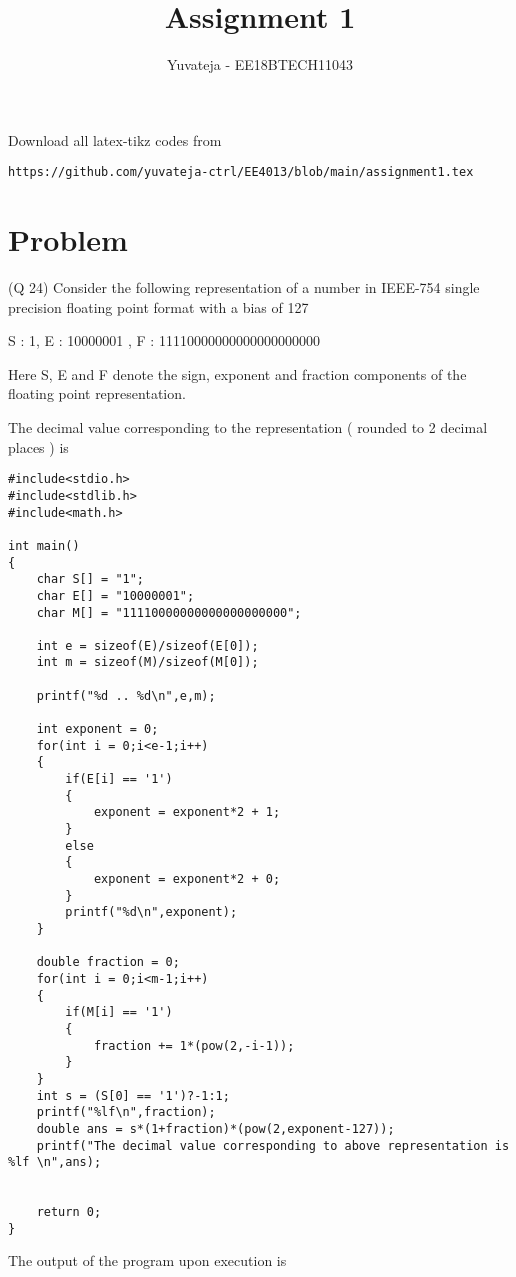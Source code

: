 \documentclass[journal,12pt,twocolumn]{IEEEtran}
\begin{document}
     \def\rightbox#1{\makebox[0in][r]{#1}}
     \def\centbox#1{\makebox[0in]{#1}}
     \def\topbox#1{\raisebox{-\baselineskip}[0in][0in]{#1}}
     \def\midbox#1{\raisebox{-0.5\baselineskip}[0in][0in]{#1}}
\vspace{3cm}
\title{Assignment 1}
\author{Yuvateja - EE18BTECH11043}
\maketitle
\newpage
\bigskip
\renewcommand{\thefigure}{\theenumi}
\renewcommand{\thetable}{\theenumi}
Download all latex-tikz codes from 
%
\begin{lstlisting}
https://github.com/yuvateja-ctrl/EE4013/blob/main/assignment1.tex
\end{lstlisting}
\section{Problem}
(Q 24) Consider the following representation of a number in IEEE-754 single precision floating point format with a bias of 127

S : 1,   E : 10000001 ,  F : 11110000000000000000000

Here S, E and F denote the sign, exponent and fraction components of the floating point representation.

The decimal value corresponding to the representation ( rounded to 2 decimal places ) is 


\begin{lstlisting}
#include<stdio.h>
#include<stdlib.h>
#include<math.h>

int main()
{
    char S[] = "1";
    char E[] = "10000001";
    char M[] = "11110000000000000000000";

    int e = sizeof(E)/sizeof(E[0]);
    int m = sizeof(M)/sizeof(M[0]);

    printf("%d .. %d\n",e,m);

    int exponent = 0;
    for(int i = 0;i<e-1;i++)
    {
        if(E[i] == '1')
        {
            exponent = exponent*2 + 1;
        }
        else
        {
            exponent = exponent*2 + 0;
        }
        printf("%d\n",exponent);
    }
    
    double fraction = 0;
    for(int i = 0;i<m-1;i++)
    {
        if(M[i] == '1')
        {
            fraction += 1*(pow(2,-i-1));
        }
    }
    int s = (S[0] == '1')?-1:1;
    printf("%lf\n",fraction);
    double ans = s*(1+fraction)*(pow(2,exponent-127));
    printf("The decimal value corresponding to above representation is %lf \n",ans);
    

    return 0;
}
\end{lstlisting}
The output of the program upon execution is 
\end{document}
